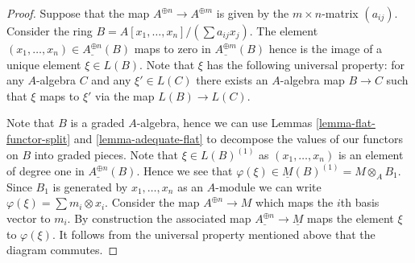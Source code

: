 \documentclass{stacks-project}
\theoremstyle{plain}
\theoremstyle{definition}
\theoremstyle{remark}
\numberwithin{equation}{subsection}
\begin{document}
\begin{proof}
Suppose that the map $A^{\oplus n} \to A^{\oplus m}$ is given by the
$m \times n$-matrix $(a_{ij})$. Consider the ring
$B = A[x_1, \ldots, x_n]/(\sum a_{ij}x_j)$. The element
$(x_1, \ldots, x_n) \in \underline{A^{\oplus n}}(B)$ maps to zero in
$\underline{A^{\oplus m}}(B)$ hence is the image of a unique element
$\xi \in L(B)$. Note that $\xi$ has the following universal property:
for any $A$-algebra $C$ and any $\xi' \in L(C)$ there exists an $A$-algebra
map $B \to C$ such that $\xi$ maps to $\xi'$ via the map $L(B) \to L(C)$.

\medskip\noindent
Note that $B$ is a graded $A$-algebra, hence we can use
Lemmas \ref{lemma-flat-functor-split} and \ref{lemma-adequate-flat}
to decompose the values of our functors on $B$ into graded pieces.
Note that $\xi \in L(B)^{(1)}$ as $(x_1, \ldots, x_n)$ is an element
of degree one in $\underline{A^{\oplus n}}(B)$. Hence we see that
$\varphi(\xi) \in \underline{M}(B)^{(1)} = M \otimes_A B_1$.
Since $B_1$ is generated by $x_1, \ldots, x_n$ as an $A$-module we
can write $\varphi(\xi) = \sum m_i \otimes x_i$. Consider the map
$A^{\oplus n} \to M$ which maps the $i$th basis vector to $m_i$.
By construction the associated map
$\underline{A^{\oplus n}} \to \underline{M}$
maps the element $\xi$ to $\varphi(\xi)$. It follows from the
universal property mentioned above that the diagram commutes.
\end{proof}
\end{document}
